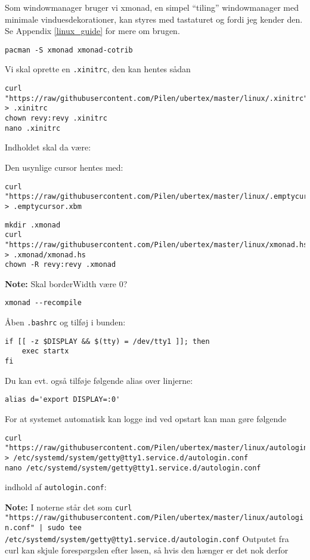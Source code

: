 \documentclass[10pt,a4paper,danish]{article}
\newcommand{\note}[1]{\begin{mdframed}[style=note]\textbf{Note:}
    #1\end{mdframed}}
\newcommand{\code}[1]{\colorbox{verbgray}{\texttt{#1}}}
\begin{document}
Som windowmanager bruger vi xmonad, en simpel ``tiling'' windowmanager med
minimale vinduesdekorationer, kan styres med tastaturet og fordi jeg kender den.
Se Appendix \ref{linux_guide} for mere om brugen.

\begin{verbatim}
pacman -S xmonad xmonad-cotrib
\end{verbatim}

Vi skal oprette en \texttt{.xinitrc}, den kan hentes sådan
\begin{verbatim}
curl "https://raw/githubusercontent.com/Pilen/ubertex/master/linux/.xinitrc" > .xinitrc
chown revy:revy .xinitrc
nano .xinitrc
\end{verbatim}
Indholdet skal da være:
\begin{mdframed}[style=code]
  
\end{mdframed}
Den usynlige cursor hentes med:
\begin{verbatim}
curl "https://raw/githubusercontent.com/Pilen/ubertex/master/linux/.emptycursor.xbm" > .emptycursor.xbm
\end{verbatim}

\begin{verbatim}
mkdir .xmonad
curl "https://raw/githubusercontent.com/Pilen/ubertex/master/linux/xmonad.hs" > .xmonad/xmonad.hs
chown -R revy:revy .xmonad
\end{verbatim}
\begin{mdframed}[style=code]
  
\end{mdframed}
\note{Skal borderWidth være 0?}
\begin{verbatim}
xmonad --recompile
\end{verbatim}

Åben \texttt{.bashrc} og tilføj i bunden:
\begin{verbatim}
if [[ -z $DISPLAY && $(tty) = /dev/tty1 ]]; then
    exec startx
fi
\end{verbatim}
Du kan evt. også tilføje følgende alias over linjerne:
\begin{verbatim}
alias d='export DISPLAY=:0'
\end{verbatim}

For at systemet automatisk kan logge ind ved opstart kan man gøre følgende
\begin{verbatim}
curl "https://raw/githubusercontent.com/Pilen/ubertex/master/linux/autologin.conf" > /etc/systemd/system/getty@tty1.service.d/autologin.conf
nano /etc/systemd/system/getty@tty1.service.d/autologin.conf
\end{verbatim}
indhold af \texttt{autologin.conf}:
\begin{mdframed}[style=code]
  
\end{mdframed}
\note{I noterne står det som \code{curl
    "https://raw/githubusercontent.com/Pilen/ubertex/master/linux/autologin.conf"
    | sudo tee /etc/systemd/system/getty@tty1.service.d/autologin.conf}
  Outputet fra curl kan skjule forespørgslen efter løsen, så hvis den hænger er
  det nok derfor}
\end{document}
